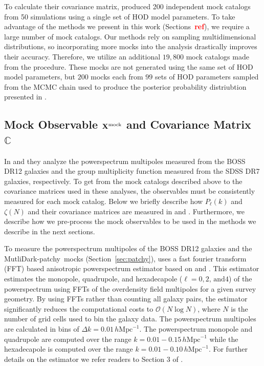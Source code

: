 \documentclass[12pt, letterpaper, preprint]{aastex}
\newcommand{\todo}[1]{{\bf \textcolor{red}{#1}}}
\newcommand{\patchy}{{\fontshape\scdefault\selectfont patchy}}
\begin{document}
To calculate their covariance matrix, \cite{sinha2017a} produced 200 
independent mock catalogs from 50 simulations using a single set of 
HOD model parameters. To take advantage of the methods we present 
in this work (Sections~\todo{ref}), we require a large number of 
mock catalogs. Our methods rely on sampling multidimensional distributions, 
so incorporating more mocks into the analysis drastically improves their 
accuracy. Therefore, we utilize an additional $19,800$ mock catalogs 
made from the procedure. These mocks are not generated using 
the same set of HOD model parameters, but $200$ mocks each from $99$ 
sets of HOD parameters sampled from the MCMC chain used to produce 
the posterior probability distriubtion presented in \cite{sinha2017a}. 

\subsection{Mock Observable ${\bf X}^\mathrm{mock}$ and Covariance Matrix $\mathbb{C}$} \label{sec:xmock}
In \cite{beutler2017} and \cite{sinha2017a} they analyze the powerspectrum multipoles 
measured from the BOSS DR12 galaxies and the group multiplicity 
function measured from the SDSS DR7 galaxies, respectively. To get from the mock 
catalogs described above to the covariance matrices used in these 
analyses, the observables must be consistently measured for each mock 
catalog. Below we briefly describe how $P_\ell(k)$ and $\zeta(N)$ 
and their covariance matrices are measured in \cite{beutler2017} 
and \cite{sinha2017a}. Furthermore, we describe how we pre-process
the mock observables to be used in the methods we describe in the 
next sections.

To measure the powerspectrum multipoles of the BOSS DR12 galaxies
and the MutliDark-\patchy~mocks (Section~\ref{sec:patchy}), \cite{beutler2017} uses a 
fast fourier transform (FFT) based anisotropic powerspectrum estimator 
based on \cite{bianchi2015} and \cite{scoccimarro2015a}. This estimator 
estimates the  monopole, quadrupole, and hexadecapole 
($\ell = 0, 2,\,\mathrm{and} 4$) of the powerspectrum using FFTs of the 
overdensity field multipoles for a given survey geometry. By using FFTs
rather than counting all galaxy pairs, the estimator significantly 
reduces the computational costs to $\mathcal{O}(N \log N)$, where
$N$ is the number of grid cells used to bin the galaxy data. 
The powerspectrum multipoles are calculated in bins of 
$\Delta k = 0.01\, h\mathrm{Mpc}^{-1}$. 
The powerspectrum monopole and quadrupole are computed over
the range $k = 0.01 - 0.15\, h\mathrm{Mpc}^{-1}$ while the 
hexadecapole is computed over the range $k = 0.01 - 0.10\, h\mathrm{Mpc}^{-1}$.
For further details on the estimator we refer readers to Section 3 of 
\cite{beutler2017}. 
\end{document}
